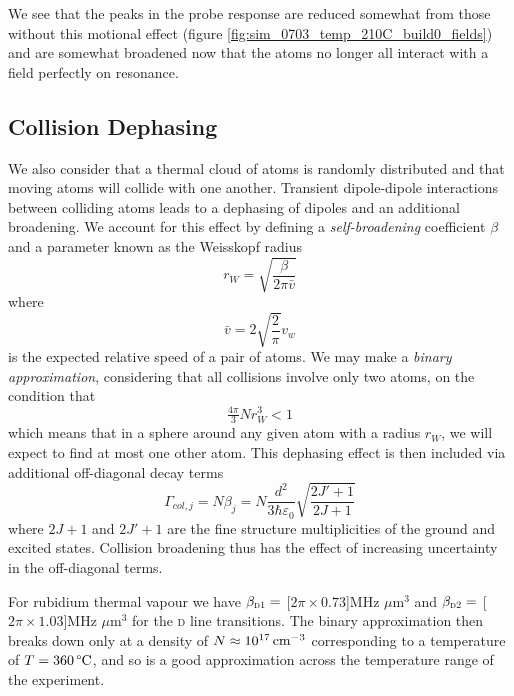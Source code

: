    We see that the peaks in the probe response are reduced somewhat from those
    without this motional effect (figure
    \ref{fig:sim_0703_temp_210C_build0_fields}) and are somewhat broadened now
    that the atoms no longer all interact with a field perfectly on resonance.

  \subsection{Collision Dephasing}

    We also consider that a thermal cloud of atoms is randomly distributed and
    that moving atoms will collide with one another. Transient dipole-dipole
    interactions between colliding atoms leads to a dephasing of dipoles and an
    additional broadening. We account for this effect by
    defining a \textit {self-broadening} coefficient $\beta$ and a parameter
    known as the Weisskopf radius\cite{Lewis1980}
    \begin{equation}\label{eqn:weisskopf}
      r_W = \sqrt{\frac{\beta}{2\pi \bar{v}}}
    \end{equation}
    where
    \begin{equation}\label{eqn:mean_vel}
    \bar{v} = 2 \sqrt{\frac{2}{\pi}} v_w
    \end{equation}
    is the expected relative speed of a pair of atoms. We may make a
    \textit{binary approximation}, considering that all collisions involve only
    two atoms, on the condition that\cite{thorne1999spectrophysics}
    \begin{equation}\label{eqn:weisskopf_cond}
      \tfrac{4\pi}{3}Nr_W^3 < 1
    \end{equation}
    which means that in a sphere around any given atom with a radius $r_W$, we
    will expect to find at most one other atom. This dephasing effect is then included via additional off-diagonal decay terms
    \begin{equation}\label{eqn:collision_broad}
      \Gamma_{col,j} = N \beta_j = 
        N \frac{d^2}{3 \hbar \varepsilon_0}\sqrt{\frac{2J'+1}{2J+1}}
    \end{equation}      
    where $2J + 1$ and $2J' + 1$ are the fine structure multiplicities of the
    ground and excited states.\cite{Weller2011, Lewis1980} Collision broadening
    thus has the effect of increasing uncertainty in the off-diagonal terms.

    For rubidium thermal vapour we have $\beta_{\textsc{d1}} = $
    \unit[$2\pi\times0.73$]{MHz $\mu$m$^3$}  and $\beta_{\textsc{d2}} = $
    \unit[$2\pi\times1.03$]{MHz $\mu$m$^3$} for the \textsc{d} line
    transitions.\cite{Weller2011} The binary approximation then breaks down only
    at a density of $N \approx \unit[10^{17}]{cm^{-3}}$ corresponding to a
    temperature of $T = \unit[360]{\textrm{\textdegree C}}$, and so is a good
    approximation across the temperature range of the experiment.

